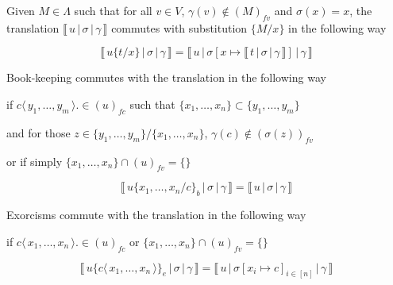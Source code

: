 \documentclass[a4paper,UKenglish,cleveref, autoref]{lipics-v2019}
\newcommand{\fv}[1]{(#1)_{fv}}
\newcommand{\fc}[1]{(#1)_{fc}}
\newcommand{\set}[1]{ \{ #1 \} }
\newcommand{\fake}[3]{#1 \langle \, #2 \, \rangle . #3}
\newcommand{\fakedist}[2]{#1 \langle \, #2 \, \rangle}
\newcommand{\sub}[3]{#1 \{ #2 / #3 \}}
\newcommand{\psub}[3]{#1 \{ #2 / #3 \}_{b}}
\newcommand{\exor}[3]{#1 \{ \fakedist{#2}{#3} \}_{e}}
\newcommand{\readbackwmap}[3]{\llbracket \, #1 \, \vert \, #2 \, \vert \, #3  \, \rrbracket }
\begin{document}
\begin{proposition}
\label{prop:suboutcomm}
Given $M \in \Lambda$ such that for all $v \in V$, $\gamma(v) \not\in \fv{M}$  and $\sigma(x) = x$, the translation $\readbackwmap{u}{\sigma}{\gamma}$ commutes with substitution $\sub{}{M}{x}$ in the following way

$$\readbackwmap{u \sub{}{t}{x}}{\sigma}{\gamma} = \readbackwmap{u}{\sigma[x \mapsto \readbackwmap{t}{\sigma}{\gamma}]}{\gamma}$$

%
\end{proposition}

%

\begin{proposition}
\label{prop:bkcomm}
Book-keeping commutes with the translation in the following way

if $\fake{c}{y_{1}, \dots, y_{m}} \in \fc{u}$ such that $\set{x_{1}, \dots, x_{n}} \subset \set{y_{1}, \dots, y_{m}}$

and for those $z \in \set{y_{1}, \dots, y_{m}} / \set{x_{1}, \dots, x_{n}}$, $\gamma(c) \not\in \fv{\sigma(z)}$

or if simply $\set{x_{1}, \dots, x_{n}} \cap \fv{u} = \set{}$

$$\readbackwmap{u \psub{}{x_{1}, \dots, x_{n}}{c}}{\sigma}{\gamma} = \readbackwmap{u}{\sigma}{\gamma}$$

\end{proposition}

\begin{proposition}
\label{prop:exorcomm}
Exorcisms commute with the translation in the following way

if $\fake{c}{x_{1}, \dots, x_{n}} \in \fc{u}$ or $\set{x_{1}, \dots, x_{n}} \cap \fv{u} = \set{}$

$$\readbackwmap{u \exor{}{c}{x_{1}, \dots, x_{n}}}{\sigma}{\gamma} = \readbackwmap{u}{\sigma[x_{i} \mapsto c]_{i \in [n]}}{\gamma}$$
\end{proposition}
\end{document}
